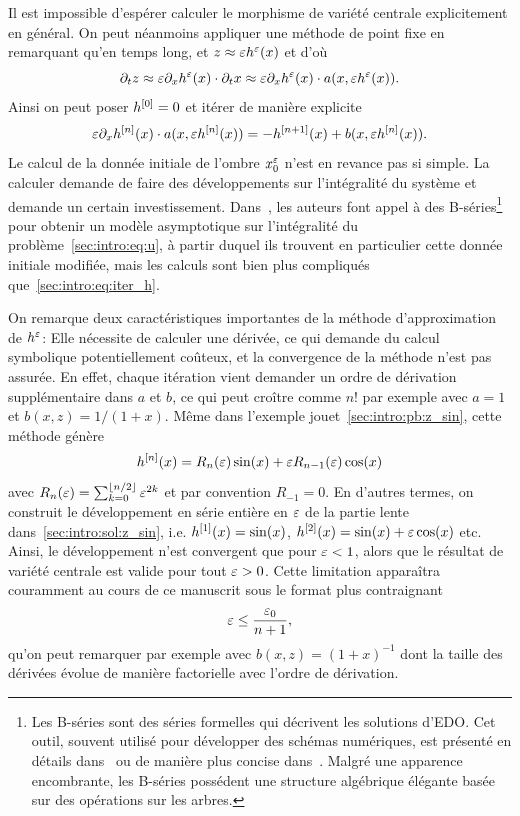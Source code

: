 Il est impossible d'espérer calculer le morphisme de variété centrale explicitement en général. On peut néanmoins appliquer une méthode de point fixe en remarquant qu'en temps long, et $z \approx \varepsilon h^{\varepsilon}(x)$ et d'où 
\begin{equation*}
    \partial_t z \approx \varepsilon \partial_x h^{\varepsilon}(x) \cdot \partial_t x
    \approx \varepsilon \partial_x h^{\varepsilon}(x) \cdot a(x, \varepsilon h^{\varepsilon}(x)) . 
\end{equation*} Ainsi on peut poser $h^{[0]} = 0$ et itérer de manière explicite
\begin{equation} \label{sec:intro:eq:iter_h}
    \varepsilon \partial_x h^{[n]}(x) \cdot a(x, \varepsilon h^{[n]} (x)) 
    = - h^{[n+1]}(x) + b(x, \varepsilon h^{[n]} (x)) .
\end{equation}
Le calcul de la donnée initiale de l'ombre $x^{\varepsilon}_0$ n'est en revance pas si simple. La calculer demande de faire des développements sur l'intégralité du système et demande un certain investissement. Dans~\cite{castella.2016.formal}, les auteurs font appel à des B-séries\footnote{
    Les B-séries sont des séries formelles qui décrivent les solutions d'EDO. Cet outil, souvent utilisé pour développer des schémas numériques, est présenté en détails dans~\cite[Chap.~III]{hairer.2006.geometric} ou de manière plus concise dans~\cite{chartier.2010.algebraic}. Malgré une apparence encombrante, les B-séries possédent une structure algébrique élégante basée sur des opérations sur les arbres.
} pour obtenir un modèle asymptotique sur l'intégralité du problème~\eqref{sec:intro:eq:u}, à partir duquel ils trouvent en particulier cette donnée initiale modifiée, mais les calculs sont bien plus compliqués que~\eqref{sec:intro:eq:iter_h}. 

On remarque deux caractéristiques importantes de la méthode d'approximation de $h^{\varepsilon}$: Elle nécessite de calculer une dérivée, ce qui demande du calcul symbolique potentiellement coûteux, et la convergence de la méthode n'est pas assurée. En effet, chaque itération vient demander un ordre de dérivation supplémentaire dans $a$ et $b$, ce qui peut croître comme $n!$ par exemple avec $a = 1$ et $b(x,z) = 1/(1+x)$. Même dans l'exemple jouet~\eqref{sec:intro:pb:z_sin}, cette méthode génère
\begin{equation*}
    h^{[n]}(x) = R_n(\varepsilon) \sin(x) + \varepsilon R_{n-1}(\varepsilon) \cos(x) 
\end{equation*}
avec $R_n(\varepsilon) = \sum_{k = 0}^{\left\lfloor n/2 \right\rfloor} \varepsilon^{2k}$ et par convention $R_{-1} = 0$. En d'autres termes, on construit le développement en série entière en $\varepsilon$ de la partie lente dans~\eqref{sec:intro:sol:z_sin}, i.e. $h^{[1]}(x) = \sin(x)$, $h^{[2]} (x) = \sin(x) + \varepsilon \cos(x)$ etc. Ainsi, le développement n'est convergent que pour $\varepsilon < 1$, alors que le résultat de variété centrale est valide pour tout $\varepsilon > 0$. 
%
Cette limitation apparaîtra couramment au cours de ce manuscrit sous le format plus contraignant
\begin{equation*}
    \varepsilon \leq \frac{\varepsilon_0}{n+1} ,
\end{equation*}
qu'on peut remarquer par exemple avec $b(x,z) = (1+x)^{-1}$ dont la taille des dérivées évolue de manière factorielle avec l'ordre de dérivation. 




